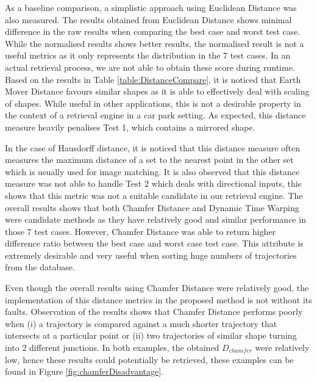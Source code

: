 As a baseline comparison, a simplistic approach using Euclidean Distance was
also measured. The results obtained from Euclidean Distance shows minimal
difference in the raw results when comparing the best case and worst test case.
While the normalised results shows better results, the normalised result is not
a useful metrics as it only represents the distribution in the 7 test cases. In
an actual retrieval process, we are not able to obtain these score during
runtime. Based on the results in Table \ref{table:DistanceCompare}, it is
noticed that Earth Mover Distance favours similar shapes as it is able to
effectively deal with scaling of shapes. While useful in other applications,
this is not a desirable property in the context of a retrieval engine in a car
park setting. As expected, this distance measure heavily penalises Test 1, which
contains a mirrored shape.

In the case of Hausdorff distance, it is noticed that this distance measure
often measures the maximum distance of a set to the nearest point in the other
set which is usually used for image matching. It is also observed that this
distance measure was not able to handle Test 2 which deals with directional
inputs, this shows that this metric was not a suitable candidate in our
retrieval engine. The overall results shows that both Chamfer Distance and
Dynamic Time Warping were candidate methods  as they have relatively good and
similar performance in those 7 test cases. However, Chamfer Distance was able
to return higher difference ratio between the best case and worst case test
case. This attribute is extremely desirable and very useful when sorting huge
numbers of trajectories from the database.

Even though the overall results using Chamfer Distance were relatively good,
the implementation of this distance metrics in the proposed method is not
without its faults. Observation of the results shows that Chamfer Distance
performs poorly when (i) a trajectory is compared against a much shorter
trajectory that intersects at a particular point or (ii) two trajectories
of similar shape turning into 2 different junctions. In both examples,
the obtained $D_{chamfer}$ were relatively low, hence these results could
potentially be retrieved, these examples can be found in Figure
\ref{fig:chamferDisadvantage}.

